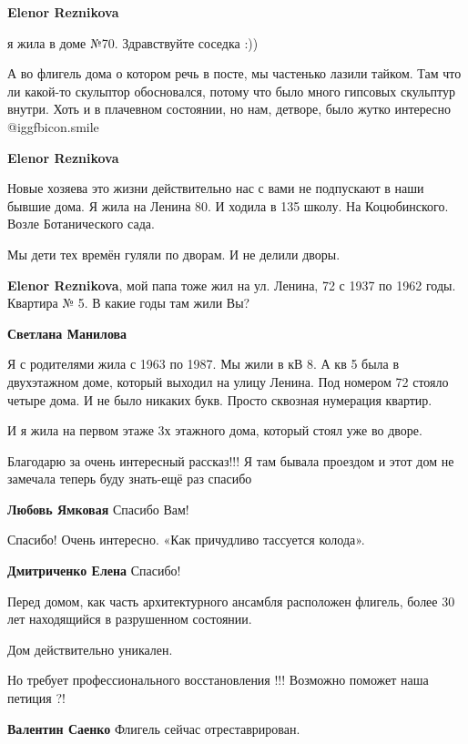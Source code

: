 \begin{itemize}
\begin{itemize}
\textbf{Elenor Reznikova} 

я жила в доме №70. Здравствуйте соседка :))

А во флигель дома о котором речь в посте, мы частенько лазили тайком. Там что
ли какой-то скульптор обосновался, потому что было много гипсовых скульптур
внутри. Хоть и в плачевном состоянии, но нам, детворе, было жутко интересно  @igg{fbicon.smile} 

\textbf{Elenor Reznikova} 

Новые хозяева это жизни действительно нас с вами не подпускают в наши бывшие
дома. Я жила на Ленина 80. И ходила в 135 школу. На Коцюбинского. Возле
Ботанического сада.

Мы дети тех времён гуляли по дворам. И не делили дворы.

\textbf{Elenor Reznikova}, мой папа тоже жил на ул. Ленина, 72 с 1937 по 1962 годы. Квартира № 5. В какие годы там жили Вы?

\textbf{Светлана Манилова} 

Я с родителями жила с 1963 по 1987. Мы жили в кВ 8. А кв 5 была в двухэтажном
доме, который выходил на улицу Ленина. Под номером 72 стояло четыре дома. И не
было никаких букв. Просто сквозная нумерация квартир.

И я жила на первом этаже 3х этажного дома, который стоял уже во дворе.

\end{itemize} %

Благодарю за очень интересный рассказ!!! Я там бывала проездом и этот дом не
замечала теперь буду знать-ещё раз спасибо

\textbf{Любовь Ямковая} Спасибо Вам!

Спасибо! Очень интересно. «Как причудливо тассуется колода».

\textbf{Дмитриченко Елена} Спасибо!


Перед домом, как часть архитектурного ансамбля расположен флигель, более 30 лет
находящийся в разрушенном состоянии.

Дом действительно уникален.

Но требует профессионального восстановления !!! Возможно поможет наша петиция
?!

\begin{itemize} %
\textbf{Валентин Саенко} Флигель сейчас отреставрирован.


\end{itemize}
\end{itemize}
